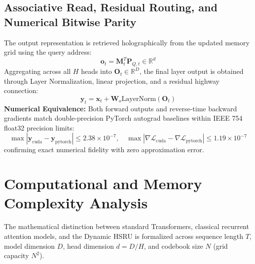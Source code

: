 \documentclass[11pt,a4paper]{article}
\begin{document}
\subsection{Associative Read, Residual Routing, and Numerical Bitwise Parity}
The output representation is retrieved holographically from the updated memory grid using the query address:
\begin{equation}
    \mathbf{o}_t = \mathbf{M}_t^T \mathbf{P}_{Q,t} \in \mathbb{R}^d
\end{equation}
Aggregating across all $H$ heads into $\mathbf{O}_t \in \mathbb{R}^D$, the final layer output is obtained through Layer Normalization, linear projection, and a residual highway connection:
\begin{equation}
    \mathbf{y}_t = \mathbf{x}_t + \mathbf{W}_o \text{LayerNorm}(\mathbf{O}_t)
\end{equation}
\textbf{Numerical Equivalence:} Both forward outputs and reverse-time backward gradients match double-precision PyTorch autograd baselines within IEEE 754 float32 precision limits:
\begin{equation}
    \max |\mathbf{y}_{\text{cuda}} - \mathbf{y}_{\text{pytorch}}| \le 2.38 \times 10^{-7}, \quad \max |\nabla \mathcal{L}_{\text{cuda}} - \nabla \mathcal{L}_{\text{pytorch}}| \le 1.19 \times 10^{-7}
\end{equation}
confirming exact numerical fidelity with zero approximation error.

\section{Computational and Memory Complexity Analysis}
The mathematical distinction between standard Transformers, classical recurrent attention models, and the Dynamic HSRU is formalized across sequence length $T$, model dimension $D$, head dimension $d = D/H$, and codebook size $N$ (grid capacity $N^2$).
\end{document}
